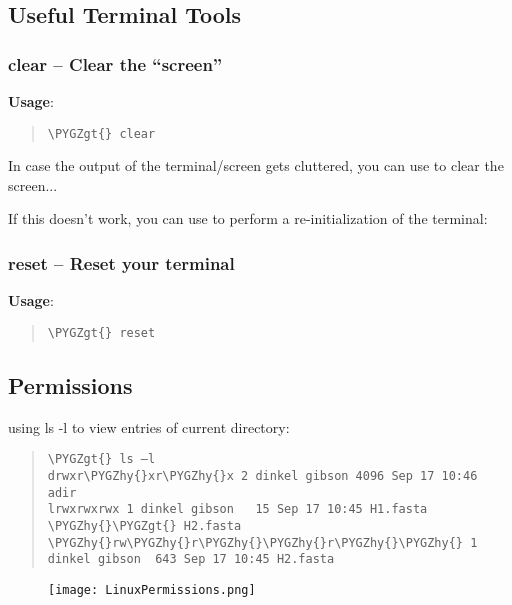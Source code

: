 \documentclass[a4paper,11pt,english]{sphinxmanual}
\def\PYGZgt{\char`\>}
\def\PYGZhy{\char`\-}
\begin{document}
\subsection{Useful Terminal Tools}
\label{introduction:useful-terminal-tools}

\subsubsection{clear – Clear the “screen”}
\label{introduction:clear-clear-the-screen}
\textbf{Usage}:  
\begin{quote}

\begin{Verbatim}[frame=single, rulecolor=\color{lightgray}, fontfamily=courier, commandchars=\\\{\}]
\PYGZgt{} clear
\end{Verbatim}
\end{quote}

In case the output of the terminal/screen gets cluttered, you can use  to clear the screen...

If this doesn't work, you can use  to perform a re-initialization of the terminal:


\subsubsection{reset – Reset your terminal}
\label{introduction:reset-reset-your-terminal}
\textbf{Usage}:  
\begin{quote}

\begin{Verbatim}[frame=single, rulecolor=\color{lightgray}, fontfamily=courier, commandchars=\\\{\}]
\PYGZgt{} reset
\end{Verbatim}
\end{quote}


\subsection{Permissions}
\label{introduction:permissions}
using ls -l to view entries of current directory:
\begin{quote}

\begin{Verbatim}[frame=single, rulecolor=\color{lightgray}, fontfamily=courier, commandchars=\\\{\}]
\PYGZgt{} ls –l
drwxr\PYGZhy{}xr\PYGZhy{}x 2 dinkel gibson 4096 Sep 17 10:46 adir
lrwxrwxrwx 1 dinkel gibson   15 Sep 17 10:45 H1.fasta \PYGZhy{}\PYGZgt{} H2.fasta
\PYGZhy{}rw\PYGZhy{}r\PYGZhy{}\PYGZhy{}r\PYGZhy{}\PYGZhy{} 1 dinkel gibson  643 Sep 17 10:45 H2.fasta
\end{Verbatim}
\end{quote}
\begin{figure}[htbp]
\centering

\texttt{[image: LinuxPermissions.png]}
\end{figure}
\end{document}
